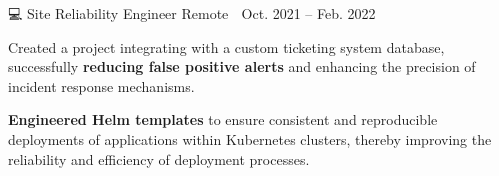 {\begin{cventries}

        {💻 Site Reliability Engineer} %
        {Remote 📍} %
        {Oct. 2021 – Feb. 2022 📆} %
        {\begin{cvitems}
                \item {Created a project integrating with a custom ticketing system database, successfully \textbf{reducing false positive alerts} and enhancing the precision of incident response mechanisms.}
                \item {\textbf{Engineered Helm templates} to ensure consistent and reproducible deployments of applications within Kubernetes clusters, thereby improving the reliability and efficiency of deployment processes.}
                \\
                \newline
            \end{cvitems}
        }



\end{cventries}}
